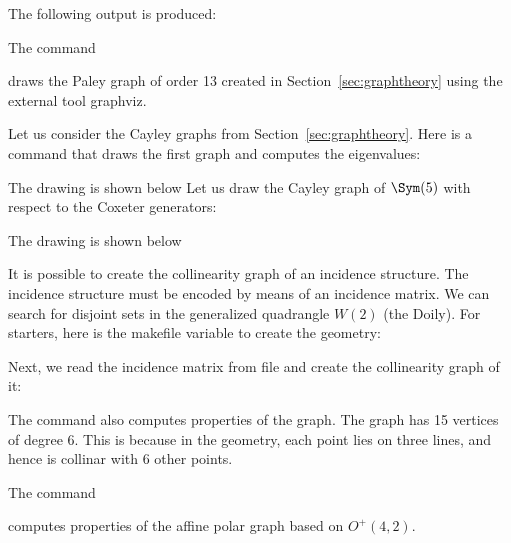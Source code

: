 
The following output is produced:


\bigskip



The command 


draws the Paley graph of order 13 created 
in Section~\ref{sec:graphtheory} 
using the external tool graphviz.

\bigskip

Let us consider the Cayley graphs from Section~\ref{sec:graphtheory}.
Here is a command that draws the first graph and computes the eigenvalues:


The drawing is shown below
Let us draw the Cayley graph of $\Sym(5)$ 
with respect to the Coxeter generators:


The drawing is shown below



\bigskip


It is possible to create the collinearity graph of an incidence structure. 
The incidence structure must be encoded by means of an incidence matrix. 
We can search for disjoint sets in the generalized quadrangle $W(2)$ (the Doily).
For starters, here is the makefile variable to create the geometry:


Next, we read the incidence matrix from file and create the collinearity graph of it:



The command also computes properties of the graph. 
The graph has 15 vertices of degree 6. 
This is because in the geometry, each point lies on three lines, 
and hence is collinar with 6 other points.




\bigskip

The command 


computes properties of the affine polar graph based on $O^+(4,2).$

